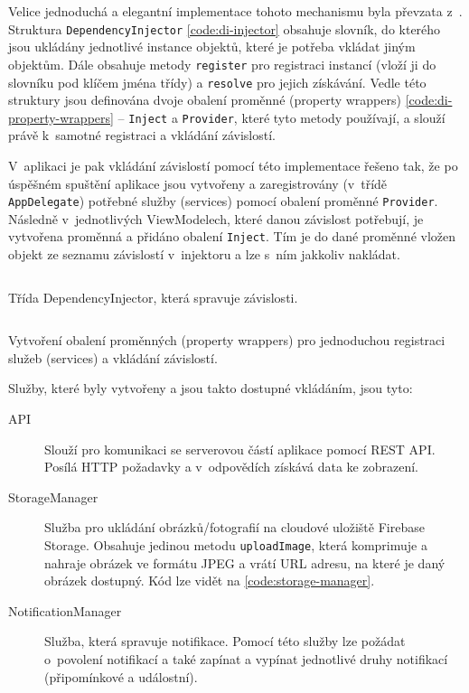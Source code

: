 \documentclass[thesis=M,czech]{FITthesis}[2019/12/23]
\begin{document}
Velice jednoduchá a elegantní implementace tohoto mechanismu byla převzata z~\cite{di}. Struktura \texttt{DependencyInjector} \ref{code:di-injector} obsahuje slovník, do kterého jsou ukládány jednotlivé instance objektů, které je potřeba vkládat jiným objektům. Dále obsahuje metody \texttt{register} pro registraci instancí (vloží ji do slovníku pod klíčem jména třídy) a \texttt{resolve} pro jejich získávání. Vedle této struktury jsou definována dvoje obalení proměnné (property wrappers) \ref{code:di-property-wrappers} -- \texttt{Inject} a \texttt{Provider}, které tyto metody používají, a slouží právě k~samotné registraci a vkládání závislostí.

V~aplikaci je pak vkládání závislostí pomocí této implementace řešeno tak, že po úspěšném spuštění aplikace jsou vytvořeny a zaregistrovány (v~třídě \texttt{AppDelegate}) potřebné služby (services) pomocí obalení proměnné \texttt{Provider}. Následně v~jednotlivých ViewModelech, které danou závislost potřebují, je vytvořena proměnná a přidáno obalení \texttt{Inject}. Tím je do dané proměnné vložen objekt ze seznamu závislostí v~injektoru a lze s~ním jakkoliv nakládat.

\begin{listing}
    \inputminted{swift}{code/di-injector.txt}
    \caption{Třída DependencyInjector, která spravuje závislosti.}
    \label{code:di-injector}
\end{listing}

\begin{listing}
    \inputminted{swift}{code/di-property-wrappers.txt}
    \caption{Vytvoření obalení proměnných (property wrappers) pro jednoduchou registraci služeb (services) a vkládání závislostí.}
    \label{code:di-property-wrappers}
\end{listing}

Služby, které byly vytvořeny a jsou takto dostupné vkládáním, jsou tyto:

\begin{description}
    \item[API] Slouží pro komunikaci se serverovou částí aplikace pomocí REST API. Posílá HTTP požadavky a v~odpovědích získává data ke zobrazení.
    \item[StorageManager] Služba pro ukládání obrázků/fotografií na cloudové uložiště Firebase Storage. Obsahuje jedinou metodu \texttt{uploadImage}, která komprimuje a nahraje obrázek ve formátu JPEG a vrátí URL adresu, na které je daný obrázek dostupný. Kód lze vidět na \ref{code:storage-manager}.
    \item[NotificationManager] Služba, která spravuje notifikace. Pomocí této služby lze požádat o~povolení notifikací a také zapínat a vypínat jednotlivé druhy notifikací (připomínkové a událostní).
\end{description}
\end{document}

